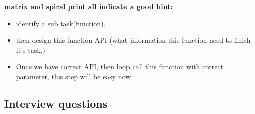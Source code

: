 \documentclass[a4paper,11pt,twoside]{book}
\begin{document}
	\par \textbf{matrix and spiral print all indicate a good hint:} 
	
	\begin{itemize}
		\item identify a sub task(function).
		
		\item then design this function API (what information this function need to finish it's task.) 
		
		\item Once we have correct API, then loop call this function with correct parameter, this step will be easy now. 
	\end{itemize}
	
\subsection{Interview questions}
\end{document}
